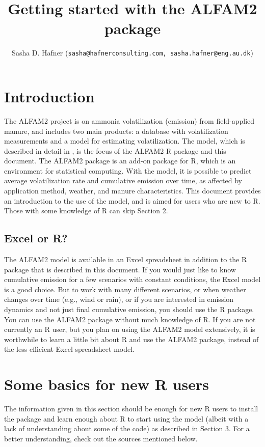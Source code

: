 \documentclass{article}
\title{Getting started with the ALFAM2 package}
\author{Sasha D. Hafner (\texttt{sasha@hafnerconsulting.com, sasha.hafner@eng.au.dk})}
\begin{document}
\maketitle

\section{Introduction}
The ALFAM2 project is on ammonia volatilization (emission) from field-applied manure, and includes two main products: a database with volatilization measurements and a model for estimating volatilization.
The model, which is described in detail in \cite{afmod2019}, is the focus of the ALFAM2 R package and this document.
The ALFAM2 package is an add-on package for R, which is an environment for statistical computing. 
With the model, it is possible to predict average volatilization rate and cumulative emission over time, as affected by application method, weather, and manure characteristics.
This document provides an introduction to the use of the model, and is aimed for users who are new to R.
Those with some knowledge of R can skip Section 2.

\subsection{Excel or R?}
The ALFAM2 model is available in an Excel spreadsheet in addition to the R package that is described in this document.
If you would just like to know cumulative emission for a few scenarios with constant conditions, the Excel model is a good choice.
But to work with many different scenarios, or when weather changes over time (e.g., wind or rain), or if you are interested in emission dynamics and not just final cumulative emission, you should use the R package.
You can use the ALFAM2 package without much knowledge of R.
If you are not currently an R user, but you plan on using the ALFAM2 model extensively, it is worthwhile to learn a little bit about R and use the ALFAM2 package, instead of the less efficient Excel spreadsheet model.

\section{Some basics for new R users}
The information given in this section should be enough for new R users to install the package and learn enough about R to start using the model (albeit with a lack of understanding about some of the code) as described in Section 3.
For a better understanding, check out the sources mentioned below.
\end{document}
